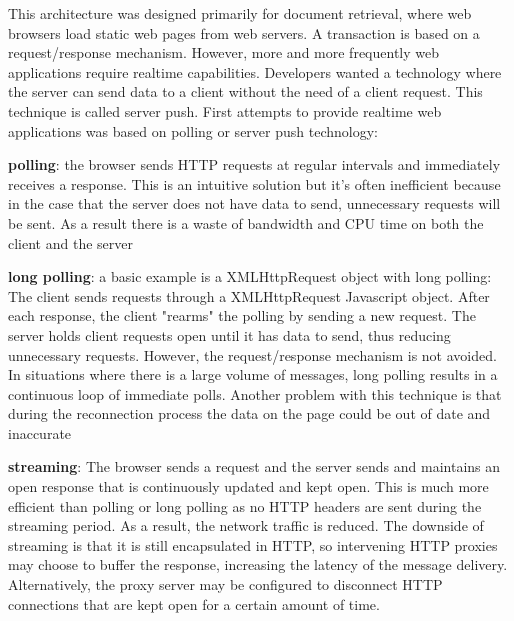 \documentclass[pdftex,10pt,a4paper]{report}
\newenvironment{packed_item}{
\begin{itemize}
  \setlength{\itemsep}{1pt}
  \setlength{\parskip}{0pt}
  \setlength{\parsep}{0pt}
}{\end{itemize}}
\begin{document}
This architecture was designed primarily for document retrieval, where web browsers load static web pages from web servers. A transaction is based on a request/response mechanism. However, more and more frequently web applications require realtime capabilities. Developers wanted a technology where the server can send data to a client without the need of a client request. This technique is called server push. First attempts to provide realtime web applications was based on polling or server push technology:
\begin{packed_item}
	\item \textbf{polling}: the browser sends HTTP requests at regular intervals and immediately receives a response. This is an intuitive solution but it's often inefficient because in the case that the server does not have data to send, unnecessary requests will be sent. As a result there is a waste of bandwidth and CPU time on both the client and the server
	\item \textbf{long polling}: a basic example is a XMLHttpRequest object with long polling: The client sends requests through a XMLHttpRequest Javascript object. After each response, the client "rearms" the polling by sending a new request. The server holds client requests open until it has data to send, thus reducing unnecessary requests. However, the request/response mechanism is not avoided. In situations where there is a large volume of messages, long polling results in a continuous loop of immediate polls. Another problem with this technique is that during the reconnection process the data on the page could be out of date and inaccurate
	\item \textbf{streaming}: The browser sends a request and the server sends and maintains an open response that is continuously updated and kept open. This is much more efficient than polling or long polling as no HTTP headers are sent during the streaming period. As a result, the network traffic is reduced. The downside of streaming is that it is still encapsulated in HTTP, so intervening HTTP proxies may choose to buffer the response, increasing the latency of the message delivery. Alternatively, the proxy server may be configured to disconnect HTTP connections that are kept open for a certain amount of time.
\end{packed_item}
\end{document}
